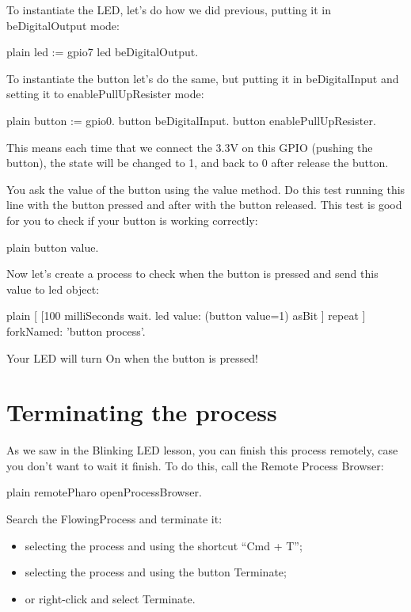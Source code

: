 \documentclass[10pt,twoside,english]{_support/latex/sbabook/sbabook}
\begin{document}
To instantiate the LED, let’s do how we did previous, putting it in beDigitalOutput mode:

\begin{displaycode}{plain}
led := gpio7
led beDigitalOutput.
\end{displaycode}

To instantiate the button let’s do the same, but putting it in beDigitalInput and setting it to enablePullUpResister mode:

\begin{displaycode}{plain}
button := gpio0.
button beDigitalInput.
button enablePullUpResister.
\end{displaycode}

This means each time that we connect the 3.3V on this GPIO (pushing the button), the state will be changed to 1, and back to 0 after release the button.

You ask the value of the button using the value method. Do this test running this line with the button pressed and after with the button released. This test is good for you to check if your button is working correctly:

\begin{displaycode}{plain}
button value.
\end{displaycode}

Now let’s create a process to check when the button is pressed and send this value to led object:

\begin{displaycode}{plain}
[ [100 milliSeconds wait. 
    led value: (button value=1) asBit
        ] repeat    
     ] forkNamed: 'button process'.
\end{displaycode}

Your LED will turn On when the button is pressed!
\section{Terminating the process}
As we saw in the Blinking LED lesson, you can finish this process remotely, case you don’t want to wait it finish. To do this, call the Remote Process Browser:

\begin{displaycode}{plain}
 remotePharo openProcessBrowser.
\end{displaycode}

Search the FlowingProcess and terminate it:

\begin{itemize}
\item selecting the process and using the shortcut “Cmd + T”;
\item selecting the process and using the button Terminate;
\item or right-click and select Terminate.
\end{itemize}
\end{document}
